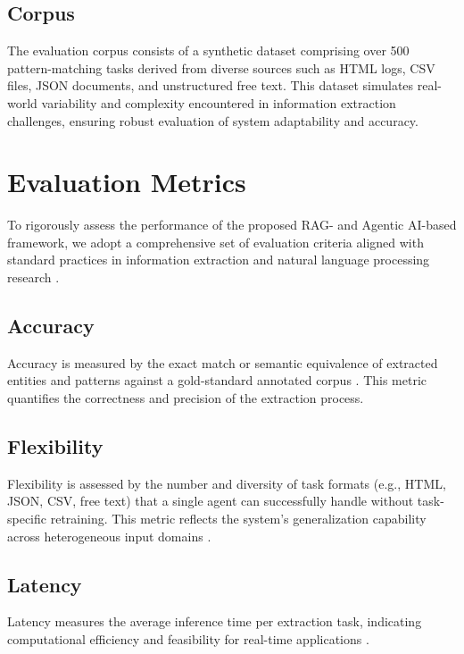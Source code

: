 \subsection{Corpus}
The evaluation corpus consists of a synthetic dataset comprising over 500 pattern-matching tasks derived from diverse sources such as HTML logs, CSV files, JSON documents, and unstructured free text. This dataset simulates real-world variability and complexity encountered in information extraction challenges, ensuring robust evaluation of system adaptability and accuracy.



\section{Evaluation Metrics}

To rigorously assess the performance of the proposed RAG- and Agentic AI-based framework, we adopt a comprehensive set of evaluation criteria aligned with standard practices in information extraction and natural language processing research \cite{Lewis2020RetrievalAugmentedGeneration, Karpukhin2020DensePassageRetrieval, Roberts2020BARTDenoising}.

\subsection{Accuracy}
Accuracy is measured by the exact match or semantic equivalence of extracted entities and patterns against a gold-standard annotated corpus \cite{Lewis2020RetrievalAugmentedGeneration}. This metric quantifies the correctness and precision of the extraction process.

\subsection{Flexibility}
Flexibility is assessed by the number and diversity of task formats (e.g., HTML, JSON, CSV, free text) that a single agent can successfully handle without task-specific retraining. This metric reflects the system’s generalization capability across heterogeneous input domains \cite{Karpukhin2020DensePassageRetrieval}.

\subsection{Latency}
Latency measures the average inference time per extraction task, indicating computational efficiency and feasibility for real-time applications \cite{Lewis2020RetrievalAugmentedGeneration}.

